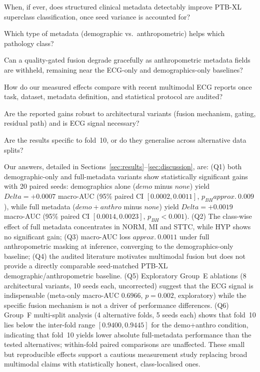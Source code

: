 \documentclass[mathematics,article,pdftex]{Definitions/mdpi}
\def\texttt#1{#1}%
\def\mathrm#1{#1}%
\def\textbf#1{#1}%
\def\emph#1{#1}%
\def\Delta{Delta }%
\def\approx{approx.\ }%
\begin{document}
\begin{description}[leftmargin=1.5em, style=sameline, font=\bfseries]
\item[Q1.] When, if ever, does structured clinical metadata detectably improve PTB-XL superclass classification, once seed variance is accounted for?
\item[Q2.] Which \emph{type} of metadata (demographic vs.\ anthropometric) helps which pathology class?
\item[Q3.] Can a quality-gated fusion degrade gracefully as anthropometric metadata fields are withheld, remaining near the ECG-only and demographics-only baselines?
\item[Q4.] How do our measured effects compare with recent multimodal ECG reports once task, dataset, metadata definition, and statistical protocol are audited?
\item[Q5.] Are the reported gains robust to architectural variants (fusion mechanism, gating, residual path) and is ECG signal necessary?
\item[Q6.] Are the results specific to fold~10, or do they generalise across alternative data splits?
\end{description}

Our answers, detailed in Sections~\ref{sec:results}--\ref{sec:discussion}, are: (Q1) \emph{both} demographic-only and full-metadata variants show statistically significant gains with \textbf{20 paired seeds}: demographics alone ($\texttt{demo}$ minus $\texttt{none}$) yield $\Delta{=}{+}0.0007$ macro-AUC (95\% paired CI $[0.0002, 0.0011]$, $p_{\mathrm{BH}}{\approx}0.009$), while full metadata ($\texttt{demo+anthro}$ minus $\texttt{none}$) yield $\Delta{=}{+}0.0019$ macro-AUC (95\% paired CI $[0.0014, 0.0023]$, $p_{\mathrm{BH}}{<}0.001$). (Q2) The class-wise effect of full metadata concentrates in NORM, \emph{MI} and \emph{STTC}, while HYP shows no significant gain; (Q3) macro-AUC loss $\approx 0.0011$ under full anthropometric masking at inference, converging to the demographics-only baseline; (Q4) the audited literature motivates multimodal fusion but does not provide a directly comparable seed-matched PTB-XL demographic/anthropometric baseline. (Q5) Exploratory Group~E ablations (8 architectural variants, 10 seeds each, uncorrected) suggest that the ECG signal is indispensable (meta-only macro-AUC $0.6966$, $p{=}0.002$, exploratory) while the specific fusion mechanism is not a driver of performance differences. (Q6) Group~F multi-split analysis (4 alternative folds, 5 seeds each) shows that fold~10 lies below the inter-fold range $[0.9400, 0.9445]$ for the \texttt{demo+anthro} condition, indicating that fold~10 yields lower absolute full-metadata performance than the tested alternatives; within-fold paired comparisons are unaffected. These small but reproducible effects support a cautious measurement study replacing broad multimodal claims with statistically honest, class-localised ones.
\end{document}
